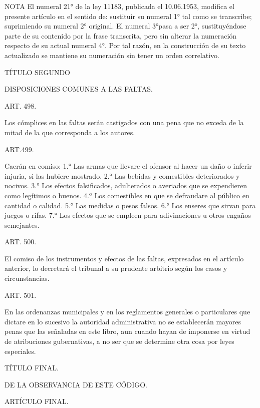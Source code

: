 NOTA
      El numeral 21° de la ley 11183, publicada el 10.06.1953, modifica el presente artículo en el sentido de: sustituir su numeral 1° tal como se transcribe; suprimiendo su numeral 2° original. El numeral 3°pasa a ser 2°, sustituyéndose parte de su contenido por la frase transcrita, pero sin alterar la numeración respecto de su actual numeral 4°. Por tal razón, en la construcción de su texto actualizado se mantiene su numeración sin tener un orden correlativo.

    TÍTULO SEGUNDO

    DISPOSICIONES COMUNES A LAS FALTAS.





    ART. 498.

    Los cómplices en las faltas serán castigados con una pena que no exceda de la mitad de la que corresponda a los autores.


    ART.499.

    Caerán en comiso:
    1.° Las armas que llevare el ofensor al hacer un daño o inferir injuria, si las hubiere mostrado.
    2.° Las bebidas y comestibles deteriorados y nocivos.
    3.° Los efectos falsificados, adulterados o averiados que se expendieren como legítimos o buenos.
    4.º Los comestibles en que se defraudare al público en cantidad o calidad.
    5.° Las medidas o pesos falsos.
    6.° Los enseres que sirvan para juegos o rifas.
    7.° Los efectos que se empleen para adivinaciones u otros engaños semejantes.


    ART. 500.

    El comiso de los instrumentos y efectos de las faltas, expresados en el artículo anterior, lo decretará el tribunal a su prudente arbitrio según los casos y circunstancias.



    ART. 501.

    En las ordenanzas municipales y en los reglamentos generales o particulares que dictare en lo sucesivo la autoridad administrativa no se establecerán mayores penas que las señaladas en este libro, aun cuando hayan de imponerse en virtud de atribuciones gubernativas, a no ser que se determine otra cosa por leyes especiales.


    TÍTULO FINAL.

    DE LA OBSERVANCIA DE ESTE CÓDIGO.





    ARTÍCULO FINAL.

